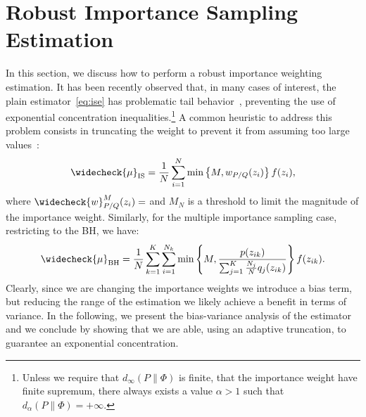 \documentclass{article}
\begin{document}
\section{Robust Importance Sampling Estimation}\label{sec:robust}
In this section, we discuss how to perform a robust importance weighting estimation. It has been recently observed that, in many cases of interest, the plain estimator~\eqref{eq:ise} has problematic tail behavior~\cite{metelli2018policy}, preventing the use of exponential concentration inequalities.\footnote{Unless we require that $d_{\infty}(P \| \Phi)$ is finite, \ie that the importance weight have finite supremum, there always exists a value $\alpha>1$ such that $d_{\alpha}(P \| \Phi)=+\infty$.} A common heuristic to address this problem consists in truncating the weight to prevent it from assuming too large values~\cite{ionides2008truncated}:
\begin{align}\label{eq:truncatedise}
	\widecheck{\mu}_{\text{IS}} = \frac{1}{N}\sum_{i=1}^{N} \min \left\{ M, {w}_{P/Q}(z_i) \right\} f(z_i),
\end{align}
where $\widecheck{w}_{P/Q}^M(z_i) = $ and $M_N$ is a threshold to limit the magnitude of the importance weight. Similarly, for the multiple importance sampling case, restricting to the BH, we have:
\begin{align}\label{eq:truncatedmise}
	\widecheck{\mu}_{\text{BH}} =\frac{1}{N} \sum_{k=1}^K\sum_{i=1}^{N_k} \min \left\{M,  \frac{p(z_{ik})}{\sum_{j=1}^K \frac{N_j}{N} q_j(z_{ik})} \right\} f(z_{ik}).
\end{align}
Clearly, since we are changing the importance weights we introduce a bias term, but reducing the range of the estimation we likely achieve a benefit in terms of variance. In the following, we present the bias-variance analysis of the estimator and we conclude by showing that we are able, using an adaptive truncation, to guarantee an exponential concentration.
\end{document}
